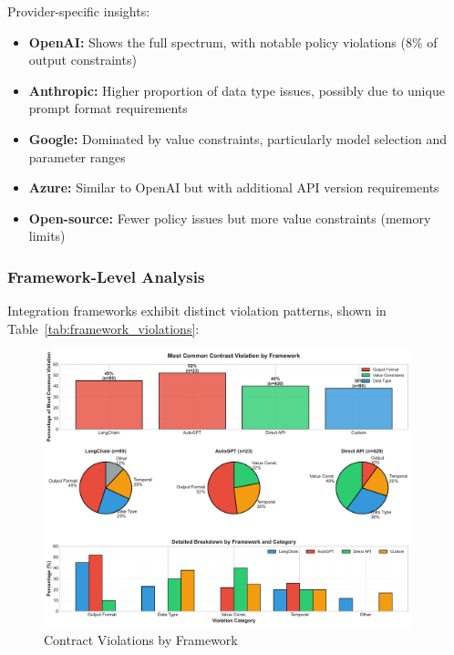 \documentclass[11pt]{article}
\begin{document}
Provider-specific insights:
\begin{itemize}
    \item \textbf{OpenAI:} Shows the full spectrum, with notable policy violations (8\% of output constraints)~\cite{githubopenai331}
    \item \textbf{Anthropic:} Higher proportion of data type issues, possibly due to unique prompt format requirements~\cite{anthropic2023docs}
    \item \textbf{Google:} Dominated by value constraints, particularly model selection and parameter ranges
    \item \textbf{Azure:} Similar to OpenAI but with additional API version requirements~\cite{azureopenai2023}
    \item \textbf{Open-source:} Fewer policy issues but more value constraints (memory limits)
\end{itemize}

\subsubsection{Framework-Level Analysis}

Integration frameworks exhibit distinct violation patterns, shown in Table~\ref{tab:framework_violations}:

\begin{figure}[h]
\centering
\includegraphics[width=0.95\textwidth]{fig5_violations_by_framework.pdf}
\caption{Contract Violations by Framework}
\label{fig:framework_violations}
\end{figure}
\end{document}
